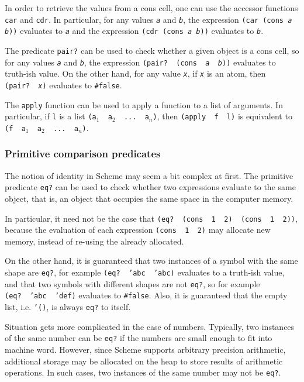 In order to retrieve the values from a cons cell, one can
use the accessor functions \texttt{car} and \texttt{cdr}.
In particular, for any values \texttt{\textit{a}} and
\texttt{\textit{b}}, the expression \texttt{(car (cons \textit{a} \textit{b}))}
evaluates to \texttt{\textit{a}} and the expression
\texttt{(cdr (cons \textit{a} \textit{b}))} evaluates
to \texttt{\textit{b}}.

The predicate \texttt{pair?} can be used to check whether a given
object is a cons cell, so for any values \texttt{\textit{a}}
and \texttt{\textit{b}}, the expression
\texttt{(pair?\,\,(cons\,\,\textit{a}\,\,\textit{b}))}
evaluates to truth-ish value. On the other hand,
for any value \texttt{\textit{x}}, if \texttt{\textit{x}} is an
atom, then \texttt{(pair?\,\,\textit{x})} evaluates
to \texttt{\#false}.

The \texttt{apply} function can be used to apply a function
to a list of arguments. In particular, if \texttt{l} is a list
\texttt{(a$_1$\,\,a$_2$\,\,...\,\,a$_n$)}, then \texttt{(apply\,\,f\,\,l)}
is equivalent to \texttt{(f\,\,a$_1$\,\,a$_2$\,\,...\,\,a$_n$)}.

\subsubsection{Primitive comparison predicates}

The notion of identity in Scheme may seem a bit complex at first.
The primitive predicate \texttt{eq?} can be used to check whether
two expressions evaluate to the same object, that is, an object
that occupies the same space in the computer memory.

In particular, it need not be the case that
\texttt{(eq?\,\,(cons\,\,1\,\,2)\,\,(cons\,\,1\,\,2))}, because
the evaluation of each expression \texttt{(cons\,\,1\,\,2)} may allocate
new memory, instead of re-using the already allocated.

On the other hand, it is guaranteed that two instances of
a symbol with the same shape are \texttt{eq?}, for example
\texttt{(eq?\,\,'abc\,\,'abc)} evaluates to a truth-ish value,
and that two symbols with different shapes are not \texttt{eq?},
so for example \texttt{(eq?\,\,'abc\,\,'def)} evaluates to
\texttt{\#false}. Also, it is guaranteed that the empty list,
i.e. \texttt{'()}, is always \texttt{eq?} to itself.

Situation gets more complicated in the case of numbers.
Typically, two instances of the same number can be \texttt{eq?}
if the numbers are small enough to fit into machine word.
However, since Scheme supports arbitrary precision arithmetic,
additional storage may be allocated on the heap to store
results of arithmetic operations. In such cases, two instances
of the same number may not be \texttt{eq?}.

